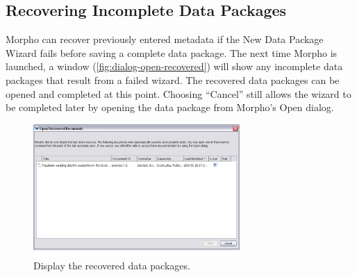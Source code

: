 \subsection{Recovering Incomplete Data Packages} \label{sec:dp-recover}

Morpho can recover previously entered metadata if the New Data Package
Wizard fails before saving a complete data package. The next time Morpho
is launched, a window (\autoref{fig:dialog-open-recovered}) will show any
incomplete data packages that result from a failed wizard. The recovered
data packages can be opened and completed at this point. Choosing
``Cancel'' still allows the wizard to be completed later by opening the
data package from Morpho’s Open dialog.

\begin{figure}
  \centering
    \includegraphics[width=0.7\textwidth]{images/dialog-open-recovered.jpg}
  \caption{Display the recovered data packages.}
  \label{fig:dialog-open-recovered}
\end{figure}
